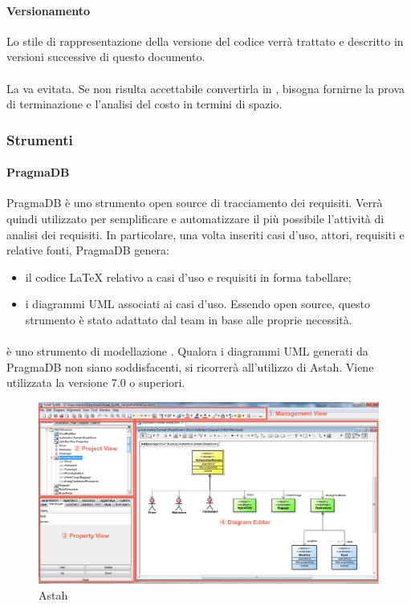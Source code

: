  \paragraph{Versionamento}
 Lo stile di rappresentazione della versione del codice verrà trattato e descritto in versioni successive di questo documento.
 \paragraph{}
 La  va evitata. Se non risulta accettabile convertirla in , bisogna fornirne la prova di terminazione e l'analisi del costo in termini di spazio.
\subsubsection{Strumenti}
 \paragraph{PragmaDB} 
  PragmaDB è uno strumento open source di tracciamento dei requisiti. Verrà quindi utilizzato per semplificare e automatizzare il più possibile l'attività di analisi dei requisiti. In particolare, una volta inseriti casi d'uso, attori, requisiti e relative fonti, PragmaDB genera: 
  \begin{itemize}
  \item il codice \LaTeX{} relativo a casi d'uso e requisiti in forma tabellare;
  \item i diagrammi UML associati ai casi d'uso.
  Essendo open source, questo strumento è stato adattato dal team \GRUPPO{} in base alle proprie necessità.
  \end{itemize}
  \paragraph{}
   è uno strumento di modellazione . Qualora i diagrammi UML generati da PragmaDB non siano soddisfacenti, si ricorrerà all'utilizzo di Astah. Viene utilizzata la versione 7.0 o superiori.
\begin{figure}[h]
\centering
\includegraphics[scale=0.3]{img/astah.png}
\caption{Astah}\label{sec:Figura1}
\end{figure}




  
